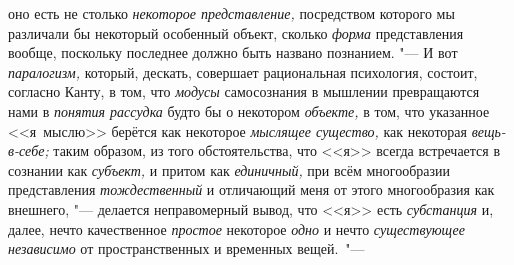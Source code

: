оно есть не столько {\em некоторое
представление,} посредством которого мы различали бы
некоторый особенный объект, сколько {\em форма} представления
вообще, поскольку последнее должно быть названо познанием. "--- И вот
{\em паралогизм,} который, дескать, совершает рациональная психология,
состоит, согласно Канту, в том, что {\em модусы}
самосознания в мышлении превращаются нами в {\em понятия рассудка}
будто бы о некотором {\em объекте,} в том, что
указанное <<я~мыслю>> берётся как некоторое {\em мыслящее существо,}
как некоторая {\em вещь-в-себе;} таким
образом, из того обстоятельства, что <<я>> всегда встречается в сознании
как {\em субъект,} и притом как {\em единичный,} при всём
многообразии представления {\em тождественный} и
отличающий меня от этого многообразия как внешнего, "---
делается неправомерный вывод, что <<я>> есть {\em субстанция} и,
далее, нечто качественное {\em простое} некоторое {\em одно}
и нечто {\em существующее независимо} от пространственных и временных
вещей.~"---

